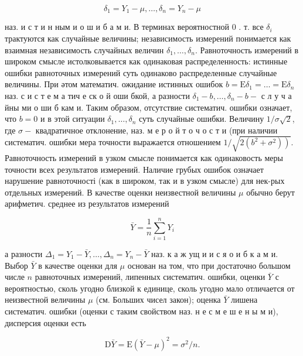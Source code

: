 \documentclass[10pt]{article}
\begin{document}
\[

\delta_{1}=Y_{1}-\mu, \ldots, \delta_{n}=Y_{n}-\mu

\]



наз. и с т и н ным и о ш и б а м и. В терминах вероятностной 0 . т. все $\delta_{i}$ трактуются как случайные величины; независимость измерений понимается как взаимная независимость случайных величин $\delta_{1}, \ldots, \delta_{n}$. Равноточность измерений в широком смысле истолковывается как одинаковая распределенность: истинные ошибки равноточных измерений суть одинаково распределенные случайные величины. При әтом математич. ожидание истинных ошибок $b=\mathrm{E} \delta_{1}=\ldots=\mathrm{E} \delta_{n}$ наз. с и с т е м а тич е ск о й оши бкой, а разности $\delta_{1}-b, \ldots, \delta_{n}-b-$ с л у ч а йны ми о ши б кам и. Таким образом, отсутствие систематич. ошибки означает, что $b=0$ и в этой ситуации $\delta_{1}, \ldots, \delta_{n}$ суть случайные ошибки. Величину $1 / \sigma \sqrt{2}$, где $\sigma-$ квадратичное отклонение, наз. м е р о й т о ч о с т и (при наличии систематич. ошибки мера точности выражается отношением $1 / \sqrt{\left.2\left(b^{2}+\sigma^{2}\right)\right)}$. Равноточность измерений в узком смысле понимается как одинаковость меры точности всех результатов измерений. Наличие грубых ошибок означает нарушение равноточності (как в широком, так и в узком смысле) для нек-рых отдельных измерений. В качестве оценки неизвестной величины $\mu$ обычно берут арифметич. среднее из результатов измерений



\[

\bar{Y}=\frac{1}{n} \sum_{i=1}^{n} Y_{i}

\]



а разности $\Delta_{1}=Y_{1}-\bar{Y}, \ldots, \Delta_{n}=Y_{n}-\bar{Y}$ наз. к а ж ущ и и с я о и б к а м и. Выбор $\bar{Y}$ в качестве оценки для $\mu$ основан на том, что при достаточно большом числе $n$ равноточных измерений, липенных систематич. ошибки, оценки $\bar{Y}$ с вероятностью, сколь угодно близкой к единице, сколь угодно мало отличается от неизвестной величины $\mu$ (см. Больших чисел закон); оценка $\bar{Y}$ лишена систематич. ошибки (оценки с таким свойством наз. н е с м е ш е н ы м и), дисперсия оценки есть



\[

\mathrm{D} \bar{Y}=\mathrm{E}(\bar{Y}-\mu)^{2}=\sigma^{2} / n .

\]
\end{document}
